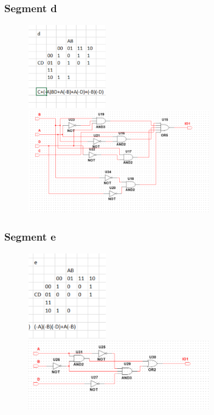 \documentclass[12pt,a4paper]{article}
\begin{document}
\newpage
\subsubsection{Segment d}
\begin{figure}[H]
\centering
\includegraphics[width=0.3\textwidth]{7seg/seg3}
\includegraphics[width=0.7\textwidth]{7seg/seg3circ}
\end{figure}

\subsubsection{Segment e}
\begin{figure}[H]
\centering
\includegraphics[width=0.3\textwidth]{7seg/seg4}
\includegraphics[width=0.7\textwidth]{7seg/seg4circ}
\end{figure}
\end{document}
